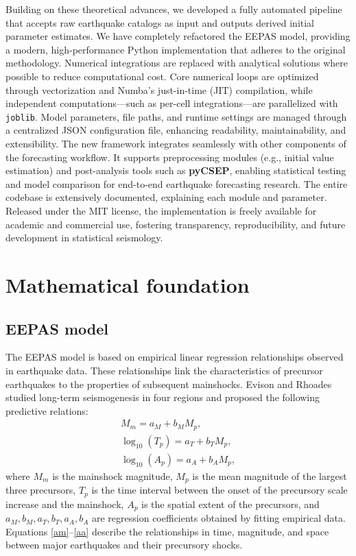 \documentclass[linenum,doublespace,onecolumn]{SSA-SRL}
\theoremstyle{lemma}
\begin{document}
Building on these theoretical advances, we developed a fully automated pipeline that accepts raw earthquake catalogs as input and outputs derived initial parameter estimates.  We have completely refactored the EEPAS model, providing a modern, high-performance Python implementation that adheres to the original methodology. Numerical integrations are replaced with analytical solutions where possible to reduce computational cost. Core numerical loops are optimized through vectorization and Numba’s just-in-time (JIT) compilation, while independent computations—such as per-cell integrations—are parallelized with \texttt{joblib}. Model parameters, file paths, and runtime settings are managed through a centralized JSON configuration file, enhancing readability, maintainability, and extensibility. The new framework integrates seamlessly with other components of the forecasting workflow. It supports preprocessing modules (e.g., initial value estimation) and post-analysis tools such as \textbf{pyCSEP}, enabling statistical testing and model comparison for end-to-end earthquake forecasting research. The entire codebase is extensively documented, explaining each module and parameter. Released under the MIT license, the implementation is freely available for academic and commercial use, fostering transparency, reproducibility, and future development in statistical seismology.

\section{Mathematical foundation}
\subsection{EEPAS model}
The EEPAS model is based on empirical linear regression relationships observed in earthquake data. These relationships link the characteristics of precursor earthquakes to the properties of subsequent mainshocks. Evison and Rhoades \cite{ER} studied long-term seismogenesis in four regions and proposed the following predictive relations:
\begin{eqnarray}
\label{am}    M_m = a_M + b_M M_p,\\
\label{at}    \log_{10}(T_p) = a_T + b_T M_p,\\
\label{aa}    \log_{10}(A_p) = a_A + b_A M_p,
\end{eqnarray}
where $M_m$ is the mainshock magnitude, $M_p$ is the mean magnitude of the largest three precursors, $T_p$ is the time interval between the onset of the precursory scale increase and the mainshock, $A_p$ is the spatial extent of the precursors, and $a_M, b_M, a_T, b_T, a_A, b_A$ are regression coefficients obtained by fitting empirical data. Equations \eqref{am}--\eqref{aa} describe the relationships in time, magnitude, and space between major earthquakes and their precursory shocks.
\end{document}
